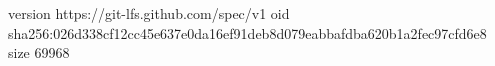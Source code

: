 version https://git-lfs.github.com/spec/v1
oid sha256:026d338cf12cc45e637e0da16ef91deb8d079eabbafdba620b1a2fec97cfd6e8
size 69968
